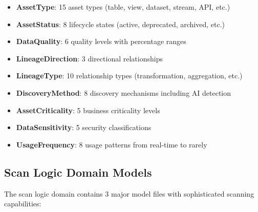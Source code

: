 \begin{itemize}
    \item \textbf{AssetType}: 15 asset types (table, view, dataset, stream, API, etc.)
    \item \textbf{AssetStatus}: 8 lifecycle states (active, deprecated, archived, etc.)
    \item \textbf{DataQuality}: 6 quality levels with percentage ranges
    \item \textbf{LineageDirection}: 3 directional relationships
    \item \textbf{LineageType}: 10 relationship types (transformation, aggregation, etc.)
    \item \textbf{DiscoveryMethod}: 8 discovery mechanisms including AI detection
    \item \textbf{AssetCriticality}: 5 business criticality levels
    \item \textbf{DataSensitivity}: 5 security classifications
    \item \textbf{UsageFrequency}: 8 usage patterns from real-time to rarely
\end{itemize}

\subsection{Scan Logic Domain Models}

The scan logic domain contains 3 major model files with sophisticated scanning capabilities:

